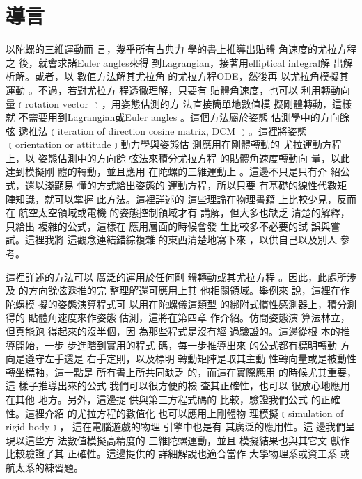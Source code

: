 \documentclass[12pt,twoside]{article}
\begin{document}
 

\part{導言\protect\bigskip}

以陀螺的三維運動而%
言，幾乎所有古典力%
學的書上推導出貼體%
角速度的尤拉方程之%
後，就會求諸Euler angles來得%
到Lagrangian，接著用elliptical integral解%
出解析解。或者，以%
數值方法解其尤拉角%
的尤拉方程ODE，然後再%
以尤拉角模擬其運動%
。不過，若對尤拉方%
程透徹理解，只要有%
貼體角速度，也可以%
利用轉動向量﹝rotation vector%
﹞，用姿態估測的方%
法直接簡單地數值模%
擬剛體轉動，這樣就%
不需要用到Lagrangian或Euler angles%
。這個方法屬於姿態%
估測學中的方向餘弦%
遞推法﹝iteration of direction cosine matrix, DCM%
﹞。這裡將姿態﹝orientation
or attitude﹞動力學與姿態估%
測應用在剛體轉動的%
尤拉運動方程上，以%
姿態估測中的方向餘%
弦法來積分尤拉方程%
的貼體角速度轉動向%
量，以此達到模擬剛%
體的轉動，並且應用%
在陀螺的三維運動上%
。這邊不只是只有介%
紹公式，還以淺顯易%
懂的方式給出姿態的%
運動方程，所以只要%
有基礎的線性代數矩%
陣知識，就可以掌握%
此方法。這裡詳述的%
這些理論在物理書籍%
上比較少見，反而在%
航空太空領域或電機%
的姿態控制領域才有%
講解，但大多也缺乏%
清楚的解釋，只給出%
複雜的公式，這樣在%
應用層面的時候會發%
生比較多不必要的試%
誤與嘗試。這裡我將%
這觀念連結錯綜複雜%
的東西清楚地寫下來%
，以供自己以及別人%
參考。

這裡詳述的方法可以%
廣泛的運用於任何剛%
體轉動或其尤拉方程%
。因此，此處所涉及%
的方向餘弦遞推的完%
整理解還可應用上其%
他相關領域。舉例來%
說，這裡在作陀螺模%
擬的姿態演算程式可%
以用在陀螺儀這類型%
的綁附式慣性感測器\cite%
[Ch 3.6.4]{titterton}上，積分測得的%
貼體角速度來作姿態%
估測，這將在第四章%
作介紹。仿間姿態演%
算法林立，但真能跑%
得起來的沒半個，因%
為那些程式是沒有經%
過驗證的。這邊從根%
本的推導開始，一步%
步進階到實用的程式%
碼，每一步推導出來%
的公式都有標明轉動%
方向是遵守左手還是%
右手定則，以及標明%
轉動矩陣是取其主動%
性轉向量或是被動性%
轉坐標軸，這一點是%
所有書上所共同缺乏%
的，而這在實際應用%
的時候尤其重要，這%
樣子推導出來的公式%
我們可以很方便的檢%
查其正確性，也可以%
很放心地應用在其他%
地方。另外，這邊提%
供與第三方程式碼的%
比較，驗證我們公式%
的正確性。這裡介紹%
的尤拉方程的數值化%
也可以應用上剛體物%
理模擬﹝simulation of rigid body﹞，%
這在電腦遊戲的物理%
引擎\cite[Ch 2.3]{pixarnote}中也是有%
其廣泛的應用性。這%
邊我們呈現以這些方%
法數值模擬高精度的%
三維陀螺運動，並且%
模擬結果也與其它文%
獻\cite{hasbun}作比較驗證了其%
正確性。這邊提供的%
詳細解說也適合當作%
大學物理系或資工系%
或航太系的練習題。
\end{document}
